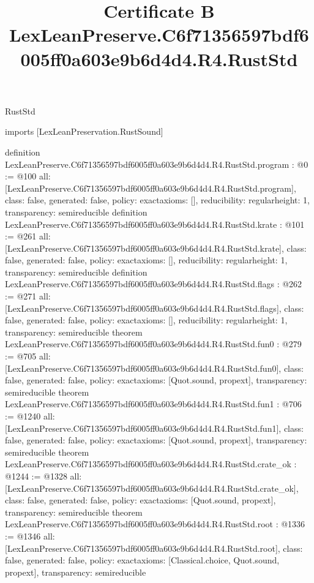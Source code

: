 \begin{lexlean}{RustStd}
\title{Certificate B LexLeanPreserve.C6f71356597bdf6005ff0a603e9b6d4d4.R4.RustStd}
\begin{coremodule}
imports [LexLeanPreservation.RustSound]

definition LexLeanPreserve.C6f71356597bdf6005ff0a603e9b6d4d4.R4.RustStd.program : @0 := @100 {
  all: [LexLeanPreserve.C6f71356597bdf6005ff0a603e9b6d4d4.R4.RustStd.program],
  class: false,
  generated: false,
  policy: exact{axioms: []},
  reducibility: regular{height: 1},
  transparency: semireducible
}
definition LexLeanPreserve.C6f71356597bdf6005ff0a603e9b6d4d4.R4.RustStd.krate : @101 := @261 {
  all: [LexLeanPreserve.C6f71356597bdf6005ff0a603e9b6d4d4.R4.RustStd.krate],
  class: false,
  generated: false,
  policy: exact{axioms: []},
  reducibility: regular{height: 1},
  transparency: semireducible
}
definition LexLeanPreserve.C6f71356597bdf6005ff0a603e9b6d4d4.R4.RustStd.flags : @262 := @271 {
  all: [LexLeanPreserve.C6f71356597bdf6005ff0a603e9b6d4d4.R4.RustStd.flags],
  class: false,
  generated: false,
  policy: exact{axioms: []},
  reducibility: regular{height: 1},
  transparency: semireducible
}
theorem LexLeanPreserve.C6f71356597bdf6005ff0a603e9b6d4d4.R4.RustStd.fun0 : @279 := @705 {
  all: [LexLeanPreserve.C6f71356597bdf6005ff0a603e9b6d4d4.R4.RustStd.fun0],
  class: false,
  generated: false,
  policy: exact{axioms: [Quot.sound, propext]},
  transparency: semireducible
}
theorem LexLeanPreserve.C6f71356597bdf6005ff0a603e9b6d4d4.R4.RustStd.fun1 : @706 := @1240 {
  all: [LexLeanPreserve.C6f71356597bdf6005ff0a603e9b6d4d4.R4.RustStd.fun1],
  class: false,
  generated: false,
  policy: exact{axioms: [Quot.sound, propext]},
  transparency: semireducible
}
theorem LexLeanPreserve.C6f71356597bdf6005ff0a603e9b6d4d4.R4.RustStd.crate_ok : @1244 := @1328 {
  all: [LexLeanPreserve.C6f71356597bdf6005ff0a603e9b6d4d4.R4.RustStd.crate_ok],
  class: false,
  generated: false,
  policy: exact{axioms: [Quot.sound, propext]},
  transparency: semireducible
}
theorem LexLeanPreserve.C6f71356597bdf6005ff0a603e9b6d4d4.R4.RustStd.root : @1336 := @1346 {
  all: [LexLeanPreserve.C6f71356597bdf6005ff0a603e9b6d4d4.R4.RustStd.root],
  class: false,
  generated: false,
  policy: exact{axioms: [Classical.choice, Quot.sound, propext]},
  transparency: semireducible
}


\end{coremodule}
\end{lexlean}
